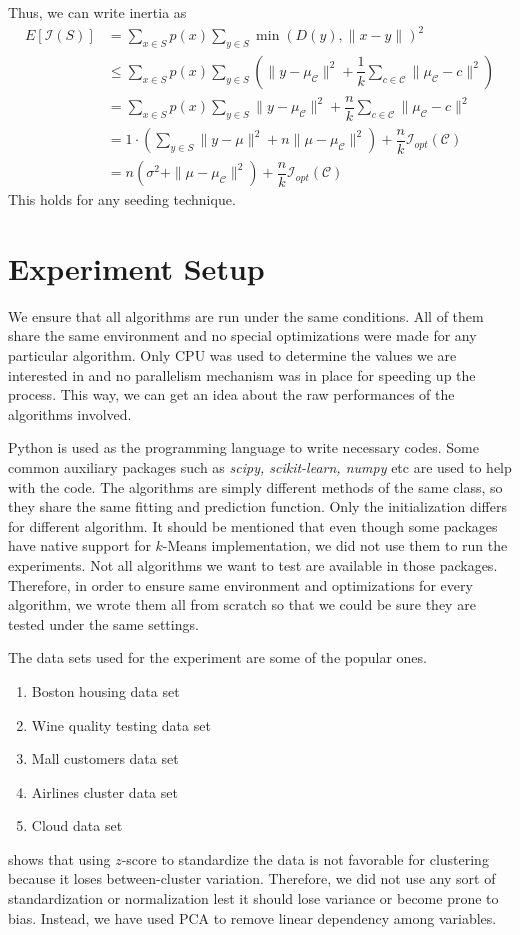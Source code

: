 \documentclass[twoside, 11pt]{article}
\newcommand{\C}{\mathcal{C}}
\newcommand{\I}{\mathcal{I}}
\begin{document}
	Thus, we can write inertia as 
		\begin{align*}
			E[\I(S)] & = \sum_{x\in S}p(x)\sum_{y\in S}\min(D(y),\|x-y\|)^2\\
					 & \leq \sum_{x\in S}p(x)\sum_{y\in S}\left(\|y-\mu_{\C}\|^2+\dfrac{1}{k}\sum_{c\in\C}\|\mu_{\C}-c\|^2\right)\\
					 & = \sum_{x\in S}p(x)\sum_{y\in S}\|y-\mu_{\C}\|^2+\dfrac{n}{k}\sum_{c\in\C}\|\mu_{\C}-c\|^2\\
					 & = 1\cdot\left(\sum_{y\in S}\|y-\mu\|^2+n\|\mu-\mu_{\C}\|^2\right)+\dfrac{n}{k}\I_{opt}(\C)\\
					 & = n(\sigma^2+\|\mu-\mu_{\C}\|^2)+\dfrac{n}{k}\I_{opt}(\C)
		\end{align*}
	This holds for any seeding technique.
	\section{Experiment Setup}
	We ensure that all algorithms are run under the same conditions. All of them share the same environment and no special optimizations were made for any particular algorithm. Only CPU was used to determine the values we are interested in and no parallelism mechanism was in place for speeding up the process. This way, we can get an idea about the raw performances of the algorithms involved.
	
	Python is used as the programming language to write necessary codes. Some common auxiliary packages such as \textit{scipy, scikit-learn, numpy} etc are used to help with the code. The algorithms are simply different methods of the same class, so they share the same fitting and prediction function. Only the initialization differs for different algorithm. It should be mentioned that even though some packages have native support for $k$-Means implementation, we did not use them to run the experiments. Not all algorithms we want to test are available in those packages. Therefore, in order to ensure same environment and optimizations for every algorithm, we wrote them all from scratch so that we could be sure they are tested under the same settings.
	
	The data sets used for the experiment are some of the popular ones.
		\begin{enumerate}
			\item Boston housing data set
			\item Wine quality testing data set
			\item Mall customers data set
			\item Airlines cluster data set
			\item Cloud data set
		\end{enumerate}
	\cite{miligan} shows that using $z$-score to standardize the data is not favorable for clustering because it loses between-cluster variation. Therefore, we did not use any sort of standardization or normalization lest it should lose variance or become prone to bias. Instead, we have used PCA to remove linear dependency among variables. 
	
\end{document}
